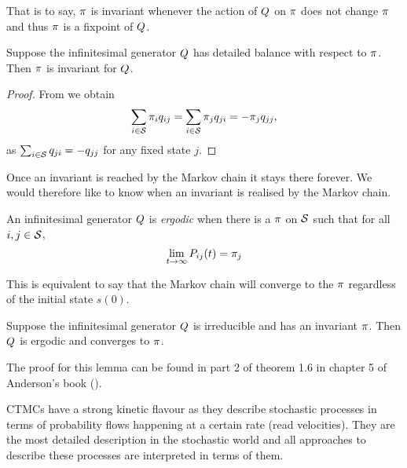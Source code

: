 That is to say, $\pi$ is invariant
whenever the action of $Q$ on $\pi$ does not change $\pi$
and thus $\pi$ is a fixpoint of $Q$.

\begin{lemma}
  Suppose the infinitesimal generator $Q$
  has detailed balance with respect to $\pi$.
  Then $\pi$ is invariant for $Q$.
\end{lemma}
\begin{proof}
  From  we obtain
  \[ \sum_{i \in \mathcal{S}} \pi_i q_{ij} =
     \sum_{i \in \mathcal{S}} \pi_j q_{ji} = -\pi_j q_{jj}, \]
  as $\sum_{i \in \mathcal{S}} q_{ji} = -q_{jj}$ for any fixed state $j$.
\end{proof}

Once an invariant \pmf is reached by the Markov chain
it stays there forever.
We would therefore like to know when an invariant
\pmf is realised by the Markov chain.

\begin{definition}[ergodicity]
  An infinitesimal generator $Q$ is \emph{ergodic} when
  there is a \pmf $\pi$ on $\mathcal{S}$ such that
  for all $i,j \in \mathcal{S}$,
  \[ \lim_{t \to \infty} P_{ij}(t) = \pi_j \]
\end{definition}

This is equivalent to say that the Markov chain
will converge to the \pmf $\pi$
regardless of the initial state $s(0)$.

\begin{lemma}
  Suppose the infinitesimal generator $Q$ is irreducible
  and has an invariant \pmf $\pi$.
  Then $Q$ is ergodic and converges to $\pi$.
\end{lemma}

The proof for this lemma can be found in part 2 of theorem 1.6
in chapter 5 of Anderson's book (\cite*[][pages 160--161]{anderson}).

CTMCs have a strong kinetic flavour as they describe
stochastic processes in terms of probability flows
happening at a certain rate (read velocities).
They are the most detailed description in the stochastic world
and all approaches to describe these processes
are interpreted in terms of them.

